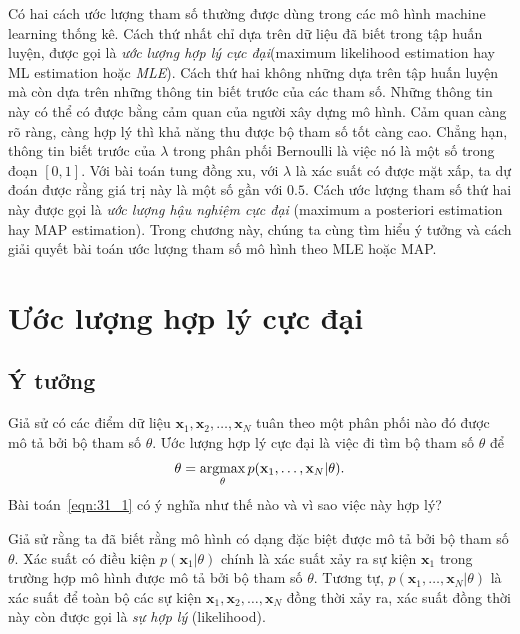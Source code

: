 
Có hai cách ước lượng tham số thường được dùng trong các mô hình machine
learning thống kê. Cách thứ nhất chỉ dựa trên dữ liệu đã biết trong tập huấn
luyện, được gọi là \textit{ước lượng hợp lý cực đại}({maximum likelihood
estimation} hay {ML estimation} hoặc \textit{MLE}). Cách thứ hai không
những dựa trên tập huấn luyện mà còn dựa trên những thông tin biết trước của các
tham số. Những thông tin này có thể có được bằng {cảm quan} của người xây dựng
mô hình. {Cảm quan} càng rõ ràng, càng hợp lý thì khả năng thu được bộ tham số
tốt càng cao. Chẳng hạn, thông tin biết trước của $\lambda$ trong phân phối
Bernoulli là việc nó là một số trong đoạn $[0, 1]$. Với bài toán tung đồng xu,
với $\lambda$ là xác suất có được mặt xấp, ta dự đoán được rằng giá trị này là
một số gần với $0.5$. Cách ước lượng tham số thứ hai này được gọi là \textit{ước
lượng hậu nghiệm cực đại} ({maximum a posteriori estimation} hay
{MAP estimation}). Trong chương này, chúng ta cùng tìm hiểu ý tưởng và
cách giải quyết bài toán ước lượng tham số mô hình theo {MLE} hoặc {MAP}.


\section{Ước lượng hợp lý cực đại}
\subsection{Ý tưởng}
Giả sử có các điểm dữ liệu $\mathbf{x}_1, \mathbf{x}_2, \dots, \mathbf{x}_N$ tuân theo một phân phối nào đó được mô tả bởi bộ tham số $\theta$.
Ước lượng hợp lý cực đại là việc đi tìm bộ tham số $\theta$ để
\begin{equation}
\label{eqn:31_1}
\theta = \operatorname*{argmax}_{\theta} p(\mathbf{x}_1, \dots, \mathbf{x}_N | \theta).
\end{equation}
Bài toán~\eqref{eqn:31_1} có ý nghĩa như thế nào và vì sao việc này hợp lý?

Giả sử rằng ta đã biết rằng mô hình có dạng đặc biệt được mô tả bởi bộ tham số
$\theta$. Xác suất có điều kiện $p(\mathbf{x}_1 | \theta)$ chính là xác suất xảy
ra {sự kiện} $\mathbf{x}_1$ trong trường hợp mô hình được mô tả bởi bộ tham số
$\theta$. Tương tự, $p(\mathbf{x}_1, \dots, \mathbf{x}_N | \theta)$ là xác suất
để toàn bộ các {sự kiện} $\mathbf{x}_1, \mathbf{x}_2, \dots, \mathbf{x}_N$ đồng
thời xảy ra, xác suất đồng thời này còn được gọi là \textit{sự hợp lý} ({likelihood}).

